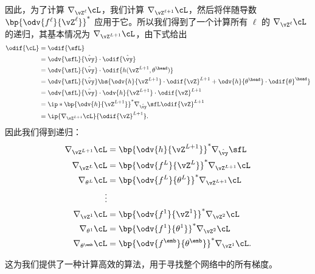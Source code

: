\documentclass[../../book-main_zh.tex]{subfiles}
\begin{document}
因此，为了计算 \(\nabla_{\vZ^{\ell}}\cL\)，我们计算 \(\nabla_{\vZ^{\ell + 1}}\cL\)，然后将伴随导数 \(\bp{\odv{f^{\ell}}{\vZ^{\ell}}}^{*}\) 应用于它。所以我们得到了一个计算所有 \(\ell\) 的 \(\nabla_{\vZ^{\ell}}\cL\) 的递归，其基本情况为 \(\nabla_{\vZ^{L + 1}}\cL\)，由下式给出
\begin{align}
    \odif{\cL}
    &= \odif{\sfL} \\
    &= \odv{\sfL}{\hat{\vy}}\cdot\odif{\hat{\vy}} \\
    &= \odv{\sfL}{\hat{\vy}}\cdot\odif{{h(\vZ^{L + 1}, \theta^{\head})}} \\
    &= \odv{\sfL}{\hat{\vy}}\bs{\odv{h}{\vZ^{L +
        1}}\cdot\odif{\vZ}^{L + 1} +
    \odv{h}{\theta^{\head}}\cdot\odif{\theta}^{\head}} \\
    &= \odv{\sfL}{\hat{\vy}}\cdot \odv{h}{\vZ^{L + 1}}\cdot\odif{\vZ}^{L + 1} \\
    &= \ip*{\bp{\odv{h}{\vZ^{L +
    1}}}^{*}\nabla_{\hat{\vy}}\sfL}{\odif{\vZ}^{L + 1}} \\
    &= \ip{\nabla_{\vZ^{L + 1}}\cL}{\odif{\vZ}^{L + 1}}.
\end{align}
因此我们得到递归：
\begin{align}
    \nabla_{\vZ^{L + 1}}\cL
    &= \bp{\odv{h}{\vZ^{L + 1}}}^{*}\nabla_{\hat{\vy}}\sfL \\
    \nabla_{\vZ^{L}}\cL
    &= \bp{\odv{f^{L}}{\vZ^{L}}}^{*}\nabla_{\vZ^{L + 1}}\cL \\
    \nabla_{\theta^{L}}\cL
    &= \bp{\odv{f^{L}}{\theta^{L}}}^{*}\nabla_{\vZ^{L + 1}}\cL \\
    \vdots &  \\
    \nabla_{\vZ^{1}}\cL
    &= \bp{\odv{f^{1}}{\vZ^{1}}}^{*}\nabla_{\vZ^{2}}\cL \\
    \nabla_{\theta^{1}}\cL
    &= \bp{\odv{f^{1}}{\theta^{1}}}^{*}\nabla_{\vZ^{2}}\cL \\
    \nabla_{\theta^{\emb}}\cL
    &= \bp{\odv{f^{\emb}}{\theta^{\emb}}}^{*}\nabla_{\vZ^{1}}\cL.
\end{align}

这为我们提供了一种计算高效的算法，用于寻找整个网络中的所有梯度。
\end{document}

